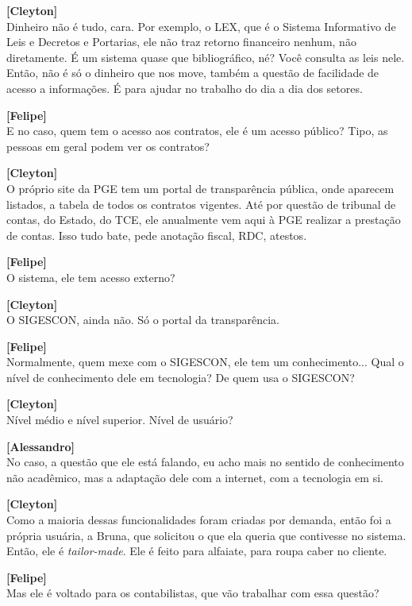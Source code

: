 \documentclass[12pt,a4paper]{article}
\begin{document}
\begin{entrevista}
    \textbf{[Cleyton]} \\
    Dinheiro não é tudo, cara. Por exemplo, o LEX, que é o Sistema Informativo de Leis e Decretos e Portarias, ele não traz retorno financeiro nenhum, não diretamente. É um sistema quase que bibliográfico, né? Você consulta as leis nele. Então, não é só o dinheiro que nos move, também a questão de facilidade de acesso a informações. É para ajudar no trabalho do dia a dia dos setores.

    \textbf{[Felipe]} \\
    E no caso, quem tem o acesso aos contratos, ele é um acesso público? Tipo, as pessoas em geral podem ver os contratos?

    \textbf{[Cleyton]} \\
    O próprio site da PGE tem um portal de transparência pública, onde aparecem listados, a tabela de todos os contratos vigentes. Até por questão de tribunal de contas, do Estado, do TCE, ele anualmente vem aqui à PGE realizar a prestação de contas. Isso tudo bate, pede anotação fiscal, RDC, atestos.

    \textbf{[Felipe]} \\
    O sistema, ele tem acesso externo?

    \textbf{[Cleyton]} \\
    O SIGESCON, ainda não. Só o portal da transparência.

    \textbf{[Felipe]} \\
    Normalmente, quem mexe com o SIGESCON, ele tem um conhecimento... Qual o nível de conhecimento dele em tecnologia? De quem usa o SIGESCON?

    \textbf{[Cleyton]} \\
    Nível médio e nível superior. Nível de usuário? 

    \textbf{[Alessandro]} \\
    No caso, a questão que ele está falando, eu acho mais no sentido de conhecimento não acadêmico, mas a adaptação dele com a internet, com a tecnologia em si.

    \textbf{[Cleyton]} \\
    Como a maioria dessas funcionalidades foram criadas por demanda, então foi a própria usuária, a Bruna, que solicitou o que ela queria que contivesse no sistema. Então, ele é \textit{tailor-made}. Ele é feito para alfaiate, para roupa caber no cliente.

    \textbf{[Felipe]} \\
    Mas ele é voltado para os contabilistas, que vão trabalhar com essa questão?


\end{entrevista}
\end{document}
